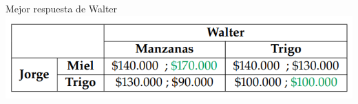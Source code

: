 \documentclass{beamer}
\begin{document}
\begin{frame}{Mejor respuesta de Walter}
    \centering
    \includegraphics[scale=0.6]{../Figures/T20.4.png}
\end{frame}



\end{document}
